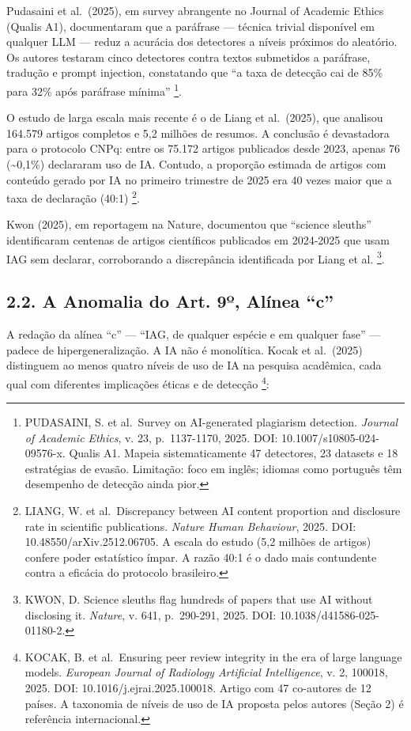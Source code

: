 \documentclass[
  12pt,
  a4paper,
  brazil,
  twoside
]{report}
\begin{document}
Pudasaini et al.~(2025), em survey abrangente no Journal of Academic
Ethics (Qualis A1), documentaram que a paráfrase --- técnica trivial
disponível em qualquer LLM --- reduz a acurácia dos detectores a níveis
próximos do aleatório. Os autores testaram cinco detectores contra
textos submetidos a paráfrase, tradução e prompt injection, constatando
que ``a taxa de detecção cai de 85\% para 32\% após paráfrase mínima''
\footnote{PUDASAINI, S. et al.~Survey on AI-generated plagiarism
  detection. \emph{Journal of Academic Ethics}, v. 23, p.~1137-1170,
  2025. DOI: 10.1007/s10805-024-09576-x. Qualis A1. Mapeia
  sistematicamente 47 detectores, 23 datasets e 18 estratégias de
  evasão. Limitação: foco em inglês; idiomas como português têm
  desempenho de detecção ainda pior.}.

O estudo de larga escala mais recente é o de Liang et al.~(2025), que
analisou 164.579 artigos completos e 5,2 milhões de resumos. A conclusão
é devastadora para o protocolo CNPq: entre os 75.172 artigos publicados
desde 2023, apenas 76 (\textasciitilde0,1\%) declararam uso de IA.
Contudo, a proporção estimada de artigos com conteúdo gerado por IA no
primeiro trimestre de 2025 era 40 vezes maior que a taxa de declaração
(40:1) \footnote{LIANG, W. et al.~Discrepancy between AI content
  proportion and disclosure rate in scientific publications.
  \emph{Nature Human Behaviour}, 2025. DOI: 10.48550/arXiv.2512.06705. A
  escala do estudo (5,2 milhões de artigos) confere poder estatístico
  ímpar. A razão 40:1 é o dado mais contundente contra a eficácia do
  protocolo brasileiro.}.

Kwon (2025), em reportagem na Nature, documentou que ``science sleuths''
identificaram centenas de artigos científicos publicados em 2024-2025
que usam IAG sem declarar, corroborando a discrepância identificada por
Liang et al. \footnote{KWON, D. Science sleuths flag hundreds of papers
  that use AI without disclosing it. \emph{Nature}, v. 641, p.~290-291,
  2025. DOI: 10.1038/d41586-025-01180-2.}.

\subsection{2.2. A Anomalia do Art. 9º, Alínea
``c''}\label{a-anomalia-do-art.-9uxba-aluxednea-c}

A redação da alínea ``c'' --- ``IAG, de qualquer espécie e em qualquer
fase'' --- padece de hipergeneralização. A IA não é monolítica. Kocak et
al.~(2025) distinguem ao menos quatro níveis de uso de IA na pesquisa
acadêmica, cada qual com diferentes implicações éticas e de detecção
\footnote{KOCAK, B. et al.~Ensuring peer review integrity in the era of
  large language models. \emph{European Journal of Radiology Artificial
  Intelligence}, v. 2, 100018, 2025. DOI: 10.1016/j.ejrai.2025.100018.
  Artigo com 47 co-autores de 12 países. A taxonomia de níveis de uso de
  IA proposta pelos autores (Seção 2) é referência internacional.}:
\end{document}
